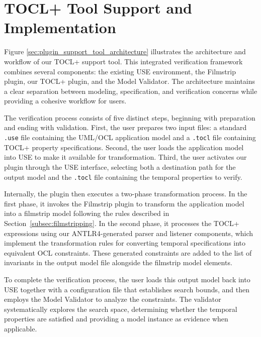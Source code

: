 \section{TOCL+ Tool Support and Implementation}


\hspace{1cm} Figure \ref{sec:plugin_support_tool_architecture} illustrates the 
architecture and workflow of our TOCL+ support tool. This integrated verification 
framework combines several components: the existing USE environment, the Filmstrip 
plugin, our TOCL+ plugin, and the Model Validator. The architecture maintains a 
clear separation between modeling, specification, and verification concerns while 
providing a cohesive workflow for users.

The verification process consists of five distinct steps, beginning with preparation 
and ending with validation. First, the user prepares two input files: a standard 
\texttt{.use} file containing the UML/OCL application model and a \texttt{.tocl} 
file containing TOCL+ property specifications. Second, the user loads the application 
model into USE to make it available for transformation. Third, the user activates 
our plugin through the USE interface, selecting both a destination path for the 
output model and the \texttt{.tocl} file containing the temporal properties to verify.

Internally, the plugin then executes a two-phase transformation process. In the 
first phase, it invokes the Filmstrip plugin to transform the application model 
into a filmstrip model following the rules described in Section~\ref{subsec:filmstripping}. 
In the second phase, it processes the TOCL+ expressions using our ANTLR4-generated 
parser and listener components, which implement the transformation rules for 
converting temporal specifications into equivalent OCL constraints. These generated 
constraints are added to the list of invariants in the output model file alongside 
the filmstrip model elements.

To complete the verification process, the user loads this output model back into 
USE together with a configuration file that establishes search bounds, and then 
employs the Model Validator to analyze the constraints. The validator systematically 
explores the search space, determining whether the temporal properties are satisfied 
and providing a model instance as evidence when applicable.

